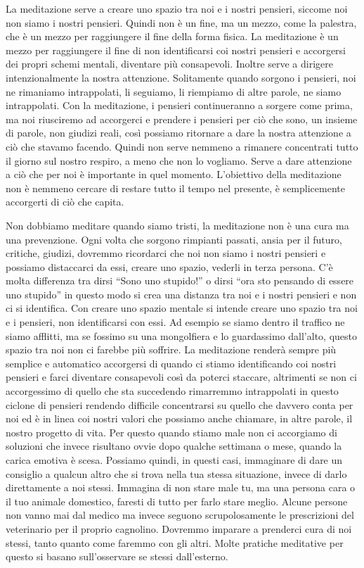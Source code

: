 \documentclass[12pt]{book} %
\begin{document}
La meditazione serve a creare uno spazio tra noi e i nostri pensieri, siccome noi non siamo i nostri pensieri. Quindi
non è un fine, ma un mezzo, come la palestra, che è un mezzo per raggiungere il fine della forma fisica. La meditazione
è un mezzo per raggiungere il fine di non identificarsi coi nostri pensieri e accorgersi dei propri schemi mentali,
diventare più consapevoli. Inoltre serve a dirigere intenzionalmente la nostra attenzione. Solitamente quando sorgono i
pensieri, noi ne rimaniamo intrappolati, li seguiamo, li riempiamo di altre parole, ne siamo intrappolati. Con la
meditazione, i pensieri continueranno a sorgere come prima, ma noi riusciremo ad accorgerci e prendere i pensieri per
ciò che sono, un insieme di parole, non giudizi reali, così possiamo ritornare a dare la nostra attenzione a ciò che
stavamo facendo. Quindi non serve nemmeno a rimanere concentrati tutto il giorno sul nostro respiro, a meno che non lo
vogliamo. Serve a dare attenzione a ciò che per noi è importante in quel momento. L'obiettivo della meditazione non è
nemmeno cercare di restare tutto il tempo nel presente, è semplicemente accorgerti di ciò che capita.

Non dobbiamo meditare quando siamo tristi, la meditazione non è una cura ma una prevenzione. Ogni volta che sorgono
rimpianti passati, ansia per il futuro, critiche, giudizi, dovremmo ricordarci che noi non siamo i nostri pensieri e
possiamo distaccarci da essi, creare uno spazio, vederli in terza persona. C'è molta differenza
tra dirsi “Sono uno stupido!” o dirsi “ora sto pensando di essere uno stupido” in questo modo si crea una distanza tra
noi e i nostri pensieri e non ci si identifica. Con creare uno spazio mentale si intende creare uno spazio tra noi e i
pensieri, non identificarsi con essi. Ad esempio se siamo dentro il traffico ne siamo afflitti, ma se fossimo su una
mongolfiera e lo guardassimo dall'alto, questo spazio tra noi non ci farebbe più soffrire. La
meditazione renderà sempre più semplice e automatico accorgersi di quando ci stiamo identificando coi nostri pensieri e
farci diventare consapevoli così da poterci staccare, altrimenti se non ci accorgessimo di quello che sta succedendo
rimarremmo intrappolati in questo ciclone di pensieri rendendo difficile concentrarsi su quello che davvero conta per
noi ed è in linea coi nostri valori che possiamo anche chiamare, in altre parole, il nostro progetto di vita. Per
questo quando stiamo male non ci accorgiamo di soluzioni che invece risultano ovvie dopo qualche settimana o mese,
quando la carica emotiva è scesa. Possiamo quindi, in questi casi, immaginare di dare un consiglio a qualcun altro che
si trova nella tua stessa situazione, invece di darlo direttamente a noi stessi. Immagina di non stare male tu, ma una
persona cara o il tuo animale domestico, faresti di tutto per farlo stare meglio. Alcune persone non vanno mai dal
medico ma invece seguono scrupolosamente le prescrizioni del veterinario per il proprio cagnolino. Dovremmo imparare a
prenderci cura di noi stessi, tanto quanto come faremmo con gli altri. Molte pratiche meditative per questo si basano
sull'osservare se stessi dall'esterno.
\end{document}
